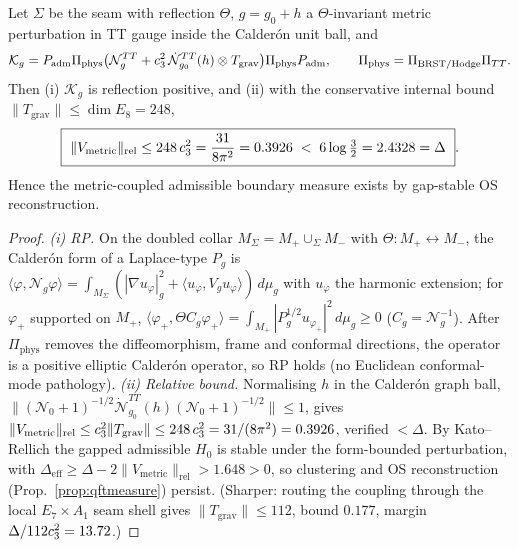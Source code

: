 \begin{proposition}
\label{prop:metricrp}
Let $\Sigma$ be the seam with reflection $\Theta$, $g=g_0+h$ a $\Theta$-invariant metric perturbation in
TT gauge inside the Calder\'on unit ball, and
\[
  \mathcal K_g=P_{\mathrm{adm}}\Pi_{\mathrm{phys}}\bigl(\mathcal N^{TT}_g
  +c_3^2\,\dot{\mathcal N}^{TT}_{g_0}(h)\otimes T_{\mathrm{grav}}\bigr)\Pi_{\mathrm{phys}}P_{\mathrm{adm}},
  \qquad \Pi_{\mathrm{phys}}=\Pi_{\mathrm{BRST/Hodge}}\Pi_{TT}.
\]
Then (i) $\mathcal K_g$ is reflection positive, and (ii) with the conservative internal bound
$\|T_{\mathrm{grav}}\|\le\dim E_8=248$,
\[
  \boxed{\ \|V_{\mathrm{metric}}\|_{\mathrm{rel}}\le 248\,\cthree^2=\frac{31}{8\pi^2}=0.3926
  \;<\;6\log\tfrac32=2.4328=\Delta\ }.
\]
Hence the metric-coupled admissible boundary measure exists by gap-stable OS reconstruction.
\end{proposition}
\begin{proof}
\emph{(i) RP.} On the doubled collar $M_\Sigma=M_+\cup_\Sigma M_-$ with $\Theta:M_+\leftrightarrow M_-$,
the Calder\'on form of a Laplace-type $P_g$ is
$\langle\varphi,\mathcal N_g\varphi\rangle=\int_{M_\Sigma}(|\nabla u_\varphi|_g^2+\langle u_\varphi,V_g u_\varphi\rangle)\,d\mu_g$
with $u_\varphi$ the harmonic extension; for $\varphi_+$ supported on $M_+$,
$\langle\varphi_+,\Theta C_g\varphi_+\rangle=\int_{M_+}|P_g^{1/2}u_{\varphi_+}|^2\,d\mu_g\ge0$
($C_g=\mathcal N_g^{-1}$). After $\Pi_{\mathrm{phys}}$ removes the diffeomorphism, frame and conformal
directions, the operator is a positive elliptic Calder\'on operator, so RP holds (no Euclidean
conformal-mode pathology). \emph{(ii) Relative bound.} Normalising $h$ in the Calder\'on graph ball,
$\|(\mathcal N_0+1)^{-1/2}\dot{\mathcal N}^{TT}_{g_0}(h)(\mathcal N_0+1)^{-1/2}\|\le1$, gives
$\|V_{\mathrm{metric}}\|_{\mathrm{rel}}\le c_3^2\|T_{\mathrm{grav}}\|\le248\,c_3^2=31/(8\pi^2)=0.3926$,
verified $<\Delta$. By Kato--Rellich the gapped admissible $H_0$ is stable under the form-bounded
perturbation, with $\Delta_{\mathrm{eff}}\ge\Delta-2\|V_{\mathrm{metric}}\|_{\mathrm{rel}}>1.648>0$, so
clustering and OS reconstruction (Prop.~\ref{prop:qftmeasure}) persist. (Sharper: routing the coupling
through the local $E_7{\times}A_1$ seam shell gives $\|T_{\mathrm{grav}}\|\le112$, bound $0.177$, margin
$\Delta/112c_3^2=13.72$.)
\end{proof}

